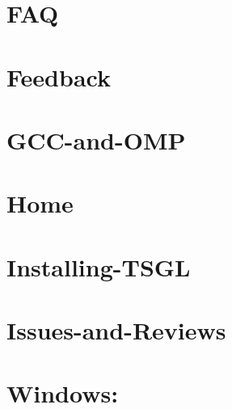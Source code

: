 \documentclass[twoside]{book}
\begin{document}
\chapter{F\-A\-Q}
\label{md__home_kodemonkey_workspace__t_s_g_l_docs-wiki__f_a_q}
\hypertarget{md__home_kodemonkey_workspace__t_s_g_l_docs-wiki__f_a_q}{}

\chapter{Feedback}
\label{md__home_kodemonkey_workspace__t_s_g_l_docs-wiki__feedback}
\hypertarget{md__home_kodemonkey_workspace__t_s_g_l_docs-wiki__feedback}{}

\chapter{G\-C\-C-\/and-\/\-O\-M\-P}
\label{md__home_kodemonkey_workspace__t_s_g_l_docs-wiki__g_c_c-and-_o_m_p}
\hypertarget{md__home_kodemonkey_workspace__t_s_g_l_docs-wiki__g_c_c-and-_o_m_p}{}

\chapter{Home}
\label{md__home_kodemonkey_workspace__t_s_g_l_docs-wiki__home}
\hypertarget{md__home_kodemonkey_workspace__t_s_g_l_docs-wiki__home}{}

\chapter{Installing-\/\-T\-S\-G\-L}
\label{md__home_kodemonkey_workspace__t_s_g_l_docs-wiki__installing-_t_s_g_l}
\hypertarget{md__home_kodemonkey_workspace__t_s_g_l_docs-wiki__installing-_t_s_g_l}{}

\chapter{Issues-\/and-\/\-Reviews}
\label{md__home_kodemonkey_workspace__t_s_g_l_docs-wiki__issues-and-_reviews}
\hypertarget{md__home_kodemonkey_workspace__t_s_g_l_docs-wiki__issues-and-_reviews}{}

\chapter{Windows\-:}
\label{md__home_kodemonkey_workspace__t_s_g_l_docs-wiki__library-_versions}
\hypertarget{md__home_kodemonkey_workspace__t_s_g_l_docs-wiki__library-_versions}{}

\end{document}
